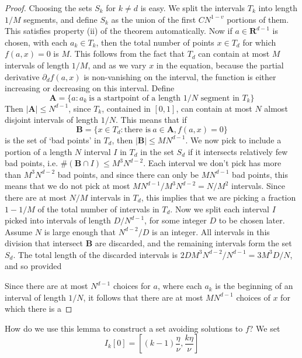 \documentclass{article}
\theoremstyle{plain}
\theoremstyle{plain}
\begin{document}
\begin{proof}
    Choosing the sets $S_k$ for $k \neq d$ is easy. We split the intervals $T_k$ into length $1/M$ segments, and define $S_k$ as the union of the first $CN^{1-v}$ portions of them. This satisfies property (ii) of the theorem automatically. Now if $a \in \mathbf{R}^{d-1}$ is chosen, with each $a_k \in T_k$, then the total number of points $x \in T_d$ for which $f(a,x) = 0$ is $M$. This follows from the fact that $T_d$ can contain at most $M$ intervals of length $1/M$, and as we vary $x$ in the equation, because the partial derivative $\partial_d f(a,x)$ is non-vanishing on the interval, the function is either increasing or decreasing on this interval. Define
    \[ \mathbf{A} = \{ a: a_k\ \text{is a startpoint of a length $1/N$ segment in $T_k$} \} \]
    Then $|\mathbf{A}| \leq N^{d-1}$, since $T_k$, contained in $[0,1]$, can contain at most $N$ almost disjoint intervals of length $1/N$. This means that if
    \[ \mathbf{B} = \{ x \in T_d: \text{there is}\ a \in \mathbf{A}, f(a,x) = 0 \} \]
    is the set of `bad points' in $T_d$, then $|\mathbf{B}| \leq MN^{d-1}$. We now pick to include a portion of a length $N$ interval $I$ in $T_d$ in the set $S_d$ if it intersects relatively few bad points, i.e. $\# (\mathbf{B} \cap I) \leq M^3 N^{d-2}$. Each interval we don't pick has more than $M^3 N^{d-2}$ bad points, and since there can only be $MN^{d-1}$ bad points, this means that we do not pick at most $MN^{d-1}/M^3N^{d-2} = N/M^2$ intervals. Since there are at most $N/M$ intervals in $T_d$, this implies that we are picking a fraction $1 - 1/M$ of the total number of intervals in $T_d$. Now we split each interval $I$ picked into intervals of length $D/N^{d-1}$, for some integer $D$ to be chosen later. Assume $N$ is large enough that $N^{d-2}/D$ is an integer. All intervals in this division that intersect $\mathbf{B}$ are discarded, and the remaining intervals form the set $S_d$. The total length of the discarded intervals is $2DM^3N^{d-2}/N^{d-1} = 3M^3D/N$, and so provided


    Since there are at most $N^{d-1}$ choices for $a$, where each $a_k$ is the beginning of an interval of length $1/N$, it follows that there are at most $MN^{d-1}$ choices of $x$ for which there is a 
\end{proof}

How do we use this lemma to construct a set avoiding solutions to $f$? We set
%
\[ I_k[0] = \left[ (k-1) \frac{\eta}{\nu}, \frac{k \eta}{\nu} \right] \]
\end{document}
